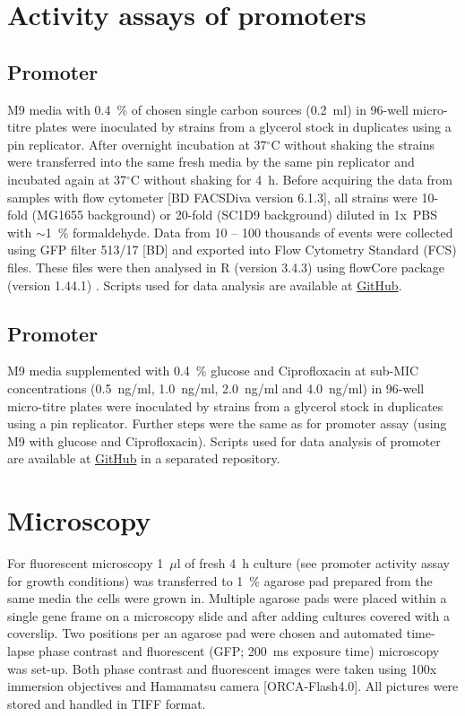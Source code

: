 \section{Activity assays of promoters}
\subsection{Promoter }
M9 media with 0.4~\% of chosen single carbon sources (0.2~ml) in 96-well micro-titre plates were inoculated by strains from a glycerol stock in duplicates using a pin replicator.
After overnight incubation at 37$^{\circ}$C without shaking the strains were transferred into the same fresh media by the same pin replicator and incubated again at 37$^{\circ}$C without shaking for 4~h.
Before acquiring the data from samples with flow cytometer [BD FACSDiva version 6.1.3], all strains were 10-fold (MG1655 background) or 20-fold (SC1\textunderscore D9 background) diluted in 1x~PBS with $\sim$1~\% formaldehyde.
Data from 10 -- 100 thousands of events were collected using GFP filter 513/17 [BD] and exported into Flow Cytometry Standard (FCS) files.
These files were then analysed in R (version 3.4.3) using flowCore package (version 1.44.1) \cite{hahne2009flowcore}.
Scripts used for data analysis are available at \href{https://github.com/marketavlkova/LacZ_FC}{GitHub}.

\subsection{Promoter }
M9 media supplemented with 0.4~\% glucose and Ciprofloxacin at sub-MIC concentrations (0.5~ng/ml, 1.0~ng/ml, 2.0~ng/ml and 4.0~ng/ml) in 96-well micro-titre plates were inoculated by strains from a glycerol stock in duplicates using a pin replicator.
Further steps were the same as for  promoter assay (using M9 with glucose and Ciprofloxacin).
Scripts used for data analysis of  promoter are available at \href{https://github.com/marketavlkova/RecA}{GitHub} in a separated repository.


\section{Microscopy}
For fluorescent microscopy 1~$\mu$l of fresh 4~h culture (see promoter activity assay for growth conditions) was transferred to 1~\% agarose pad prepared from the same media the cells were grown in.
Multiple agarose pads were placed within a single gene frame on a microscopy slide and after adding cultures covered with a coverslip.
Two positions per an agarose pad were chosen and automated time-lapse phase contrast and fluorescent (GFP; 200~ms exposure time) microscopy was set-up.
Both phase contrast and fluorescent images were taken using 100x immersion objectives and Hamamatsu camera [ORCA-Flash4.0].
All pictures were stored and handled in TIFF format.

\shorthandon{-}
